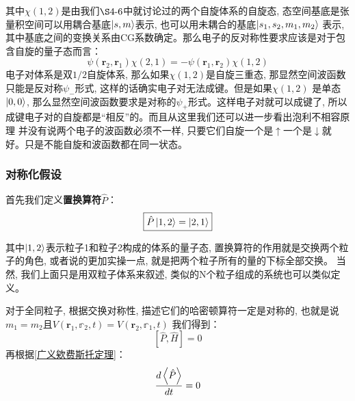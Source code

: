 其中$\chi(1,2)$是由我们$\S4\mbox{-}6$中就讨论过的两个自旋体系的自旋态, 态空间基底是张量积空间可以用耦合基底$\ket{s,m}$表示, 也可以用未耦合的基底$\ket{s_1,s_2,m_1,m_2}$
表示, 其中基底之间的变换关系由CG系数确定。那么电子的反对称性要求应该是对于包含自旋的量子态而言：
\begin{equation}
    \psi(\mathbf{r}_2,\mathbf{r}_1)\chi(2,1)=-\psi(\mathbf{r}_1,\mathbf{r}_2)\chi(1,2)
\end{equation}
电子对体系是双$1/2$自旋体系, 那么如果$\chi(1,2)$是自旋三重态, 那显然空间波函数只能是反对称$\psi_-$形式, 这样的话确实电子对无法成键。但是如果$\chi(1,2)$
是单态$\ket{0,0}$, 那么显然空间波函数要求是对称的$\psi_+$形式。这样电子对就可以成键了, 所以成键电子对的自旋都是“相反”的。而且从这里我们还可以进一步看出泡利不相容原理
并没有说两个电子的波函数必须不一样, 只要它们自旋一个是$\uparrow$一个是$\downarrow$就好。只是不能自旋和波函数都在同一状态。
\subsubsection*{对称化假设}
首先我们定义\textbf{置换算符}$\hat{P}$：
\begin{equation}
    \boxed{
        \hat{P}\ket{1,2}=\ket{2,1}
    }
\end{equation}

其中$\ket{1,2}$表示粒子1和粒子2构成的体系的量子态, 置换算符的作用就是交换两个粒子的角色, 或者说的更加实操一点, 就是把两个粒子所有的量的下标全部交换。
当然, 我们上面只是用双粒子体系来叙述, 类似的N个粒子组成的系统也可以类似定义。

对于全同粒子, 根据交换对称性, 描述它们的哈密顿算符一定是对称的, 也就是说$m_1=m_2$且$V(\mathbf{r}_1,\mathbb{r}_2,t)=V(\mathbf{r}_2,\mathbb{r}_1,t)$
我们得到：
\begin{equation}
    \label{eq:5.18}
    \left[\hat{P},\hat{H}\right]=0
\end{equation}
再根据\ref{广义欸费斯托定理}：
\begin{equation}
    \frac{d\Braket{\hat{P}}}{dt}=0
\end{equation}

